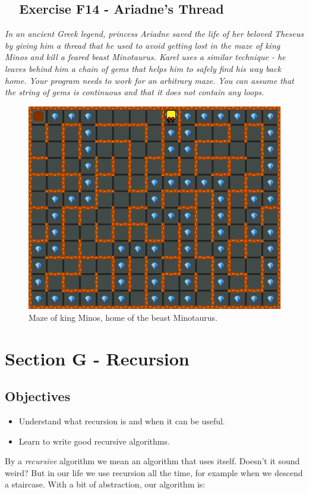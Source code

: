 \documentclass[article,A4,12pt]{llncs}
\begin{document}
{{{{\subsection{\ \ Exercise F14 - Ariadne's Thread}

{\em In an ancient Greek legend, princess Ariadne saved the life of her 
beloved Theseus by giving him a thread that he used to avoid getting lost 
in the maze of king Minos and kill a feared beast Minotaurus. Karel uses 
a similar technique - he leaves behind him a chain of gems that helps him 
to safely find his way back home. Your program needs to work for an 
arbitrary maze. You can assume that the string of gems is continuous 
and that it does not contain any loops.}\\[-7mm]

\begin{figure}[!ht]
\begin{center}
\includegraphics[height=0.4\textwidth]{img/f14.png}
\end{center}
\vspace{-4mm}
\caption{Maze of king Minos, home of the beast Minotaurus.}
\label{fig:f14}
\vspace{-4mm}
\end{figure}
\noindent

\newpage

\section{Section G - Recursion}

\subsection{Objectives} 
 
\begin{itemize}
\item Understand what recursion is and when it can be useful.
\item Learn to write good recursive algorithms.
\end{itemize}
By a {\em recursive} algorithm we mean an algorithm that uses itself. Doesn't it sound weird?
But in our life we use recursion all the time, for example when we descend a staircase.
With a bit of abstraction, our algorithm is:

}}}}
\end{document}
